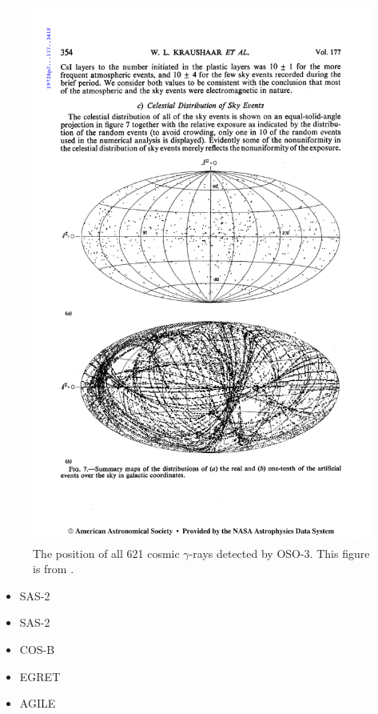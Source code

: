 \begin{figure}[htb]
\includegraphics{chapters/introduction/figures/kraushaar_et_al_1972_skymap.pdf}
\caption{The position of all 621 cosmic $\gamma$-rays
detected by \ac{OSO-3}. This figure is from 
\cite{oso_3_kraushaar_1972}. }
\end{figure}




\begin{itemize}
\item 


  \ac{SAS-2}
  

  \item SAS-2
  \item COS-B
  \item EGRET

  \item AGILE
\end{itemize}

